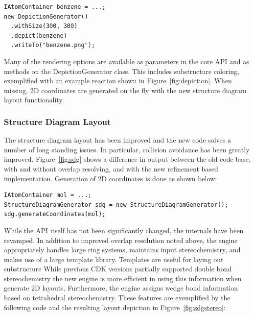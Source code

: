 \documentclass[doublespacing]{bmcart}
\begin{document}
\vspace{0.2cm}
\begin{verbatim}
IAtomContainer benzene = ...;
new DepictionGenerator()
  .withSize(300, 300)
  .depict(benzene)
  .writeTo("benzene.png");
\end{verbatim}
\vspace{0.2cm}

  Many of the rendering options are available as parameters in the
  core API and as methods on the DepictionGenerator class. This
  includes substructure coloring, exemplified with an example reaction
  shown in Figure~\ref{fig:depiction}.
  When missing, 2D coordinates are generated on the fly with the new structure
  diagram layout functionality.

  \subsubsection*{Structure Diagram Layout}

  The structure diagram layout has been improved and the new code solves a
  number of long standing issues. In particular, collision avoidance has been
  greatly improved. Figure~\ref{fig:sdg} shows a difference in output
  between the old code base, with and without overlap resolving, and with the
  new refinement based implementation\cite{Helson07}. Generation of 2D coordinates is done as shown below:

\vspace{0.2cm}
\begin{verbatim}
IAtomContainer mol = ...;
StructureDiagramGenerator sdg = new StructureDiagramGenerator();
sdg.generateCoordinates(mol);
\end{verbatim}
\vspace{0.2cm}

  While the API itself has not been significantly changed, the
  internals have been revamped. In addition to improved overlap
  resolution noted above, the engine appropriately handles large ring
  systems, maintains input stereochemistry, and makes use of a large
  template library. Templates are useful for laying out substructure
  While previous CDK versions partially supported 
  double bond stereochemistry the new engine is more efficient in
  using this information when generate 2D layouts. Furthermore, the
  engine assigns wedge bond information based on tetrahedral
  stereochemistry. These features are exemplified by the following
  code and the resulting layout depiction in
  Figure~\ref{fig:sdgstereo}:
\end{document}

